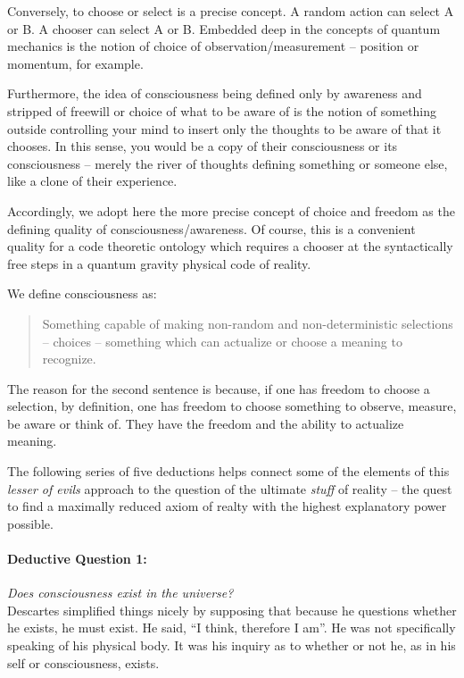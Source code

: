 \documentclass[submission,copyright,creativecommons]{eptcs}
\begin{document}
Conversely, to choose or select is a precise concept. A random action can select A or B. A chooser can select A or B. Embedded deep in the concepts of quantum mechanics is the notion of choice of observation/measurement --
position or momentum, for example.

Furthermore, the idea of consciousness being defined only by awareness and stripped of freewill or choice of what to be aware of is the notion of something outside controlling your mind to insert only the thoughts to be aware of that it chooses. In this sense, you would be a copy of their consciousness or its consciousness --
merely the river of thoughts defining something or someone else, like a clone of their experience.

Accordingly, we adopt here the more precise concept of choice and freedom as the defining quality of consciousness/awareness. Of course, this is a convenient quality for a code theoretic ontology which requires a chooser at the syntactically free steps in a quantum gravity physical code of reality.

We define consciousness as:
\begin{quote}
Something capable of making non-random and non-deterministic selections --
choices --
something which can actualize or choose a meaning to recognize.
  \source{  }
\end{quote}
The reason for the second sentence is because, if one has freedom to choose a selection, by definition, one has freedom to choose something to observe, measure, be aware or think of. They have the freedom and the ability to actualize meaning.

The following series of five deductions helps connect some of the elements of this \textit{lesser of evils} approach to the question of the ultimate \textit{stuff} of reality --
the quest to find a maximally reduced axiom of realty with the highest explanatory power possible.

\paragraph{\textbf{Deductive Question 1:}}

\textit{Does consciousness exist in the universe?}\\

Descartes simplified things nicely by supposing that because he questions whether he exists, he must exist. He said, “I think, therefore I am”. He was not specifically speaking of his physical body. It was his inquiry as to whether or not he, as in his self or consciousness, exists.
\end{document}
